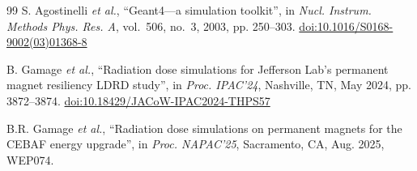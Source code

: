 \documentclass[a4paper,
               ]{jacow}
\begin{document}
{\begin{thebibliography}{99}
            S. Agostinelli \emph{et al.},
            ``Geant4---a simulation toolkit'',
            in \emph{Nucl. Instrum. Methods Phys. Res. A}, vol.~506, no.~3, 2003, pp. 250--303.
            \url{doi:10.1016/S0168-9002(03)01368-8}

              B. Gamage \emph{et al.},
            ``Radiation dose simulations for Jefferson Lab's permanent magnet resiliency LDRD study'',
            in \emph{Proc. IPAC'24}, Nashville, TN, May 2024, pp. 3872--3874.
            \url{doi:10.18429/JACoW-IPAC2024-THPS57}

            B.R. Gamage \emph{et al.},
            ``Radiation dose simulations on permanent magnets for the CEBAF energy upgrade'',
            in \emph{Proc. NAPAC'25}, Sacramento, CA, Aug. 2025, WEP074.

    \end{thebibliography}
} %
\end{document}
